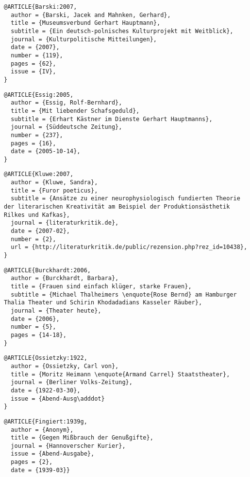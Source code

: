 \documentclass[ngerman]{scrartcl}
\begin{document}
\begin{lstlisting}
@ARTICLE{Barski:2007,
  author = {Barski, Jacek and Mahnken, Gerhard},
  title = {Museumsverbund Gerhart Hauptmann},
  subtitle = {Ein deutsch-polnisches Kulturprojekt mit Weitblick},
  journal = {Kulturpolitische Mitteilungen},
  date = {2007},
  number = {119},
  pages = {62},
  issue = {IV},
}
\end{lstlisting}

\begin{lstlisting}
@ARTICLE{Essig:2005,
  author = {Essig, Rolf-Bernhard},
  title = {Mit liebender Schafsgeduld},
  subtitle = {Erhart Kästner im Dienste Gerhart Hauptmanns},
  journal = {Süddeutsche Zeitung},
  number = {237},
  pages = {16},
  date = {2005-10-14},
}
\end{lstlisting}

\begin{lstlisting}
@ARTICLE{Kluwe:2007,
  author = {Kluwe, Sandra},
  title = {Furor poeticus},
  subtitle = {Ansätze zu einer neurophysiologisch fundierten Theorie der literarischen Kreativität am Beispiel der Produktionsästhetik Rilkes und Kafkas},
  journal = {literaturkritik.de},
  date = {2007-02},
  number = {2},
  url = {http://literaturkritik.de/public/rezension.php?rez_id=10438},
}
\end{lstlisting}

\begin{lstlisting}
@ARTICLE{Burckhardt:2006,
  author = {Burckhardt, Barbara},
  title = {Frauen sind einfach klüger, starke Frauen},
  subtitle = {Michael Thalheimers \enquote{Rose	Bernd} am Hamburger Thalia Theater und Schirin Khodadadians Kasseler Räuber},
  journal = {Theater heute},
  date = {2006},
  number = {5},
  pages = {14-18},
}
\end{lstlisting}

\begin{lstlisting}
@ARTICLE{Ossietzky:1922,
  author = {Ossietzky, Carl von},
  title = {Moritz Heimann \enquote{Armand Carrel} Staatstheater},
  journal = {Berliner Volks-Zeitung},
  date = {1922-03-30},
  issue = {Abend-Ausg\adddot}
}
\end{lstlisting}

\begin{lstlisting}
@ARTICLE{Fingiert:1939g,
  author = {Anonym},
  title = {Gegen Mißbrauch der Genußgifte},
  journal = {Hannoverscher Kurier},
  issue = {Abend-Ausgabe},
  pages = {2},
  date = {1939-03}}
\end{lstlisting}
\end{document}
